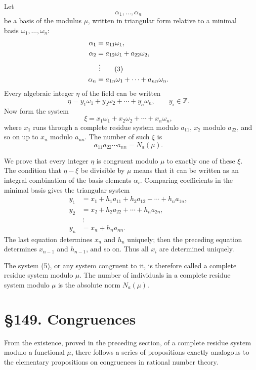 \documentclass[12pt,a4paper]{article}
\newcommand{\webersection}[2]{\clearpage\section*{\S #1. #2}}
\begin{document}
Let
\begin{equation}
 \alpha_1,
\ldots,
\alpha_n \tag{2}
\end{equation}
be a basis of the modulus \(\mu\), written in triangular form relative to a minimal basis \(\omega_1,
\ldots,
\omega_n\):
\begin{align}
 \alpha_1&=a_{11}\omega_1,\notag\\
 \alpha_2&=a_{12}\omega_1+a_{22}\omega_2,\notag\\
 &\ \vdots \tag{3}\\
 \alpha_n&=a_{1n}\omega_1+
\cdots+a_{nn}\omega_n.
\notag
\end{align}
Every algebraic integer \(\eta\) of the field can be written
\begin{equation}
 \eta=y_1\omega_1+y_2\omega_2+
\cdots+y_n\omega_n,
\qquad y_i\in\mathbb Z. \tag{4}
\end{equation}
Now form the system
\begin{equation}
 \xi=x_1\omega_1+x_2\omega_2+
\cdots+x_n\omega_n, \tag{5}
\end{equation}
where \(x_1\) runs through a complete residue system modulo \(a_{11}\), \(x_2\) modulo \(a_{22}\), and so on up to \(x_n\) modulo \(a_{nn}\).  The number of such \(\xi\) is
\[
 a_{11}a_{22}\cdots a_{nn}=N_a(\mu).
\]

We prove that every integer \(\eta\) is congruent modulo \(\mu\) to exactly one of these \(\xi\).  The condition that \(\eta-
\xi\) be divisible by \(\mu\) means that it can be written as an integral combination of the basis elements \(\alpha_i\).  Comparing coefficients in the minimal basis gives the triangular system
\begin{align*}
 y_1&=x_1+h_1a_{11}+h_2a_{12}+
\cdots+h_na_{1n},\\
 y_2&=x_2+h_2a_{22}+
\cdots+h_na_{2n},\\
 &\ \vdots\\
 y_n&=x_n+h_na_{nn}.
\end{align*}
The last equation determines \(x_n\) and \(h_n\) uniquely; then the preceding equation determines \(x_{n-1}\) and \(h_{n-1}\), and so on.  Thus all \(x_i\) are determined uniquely.

The system (5), or any system congruent to it, is therefore called a complete residue system modulo \(\mu\).  The number of individuals in a complete residue system modulo \(\mu\) is the absolute norm \(N_a(\mu)\).

\webersection{149}{Congruences}

From the existence, proved in the preceding section, of a complete residue system modulo a functional \(\mu\), there follows a series of propositions exactly analogous to the elementary propositions on congruences in rational number theory.
\end{document}
